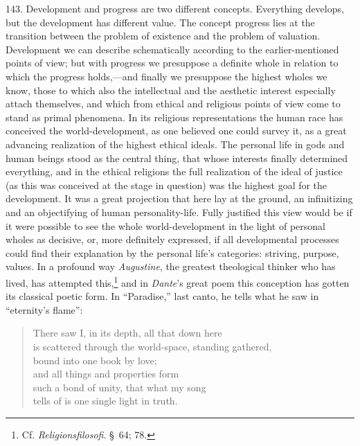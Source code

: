 \documentclass[12pt,a4paper]{book}
\begin{document}
143. Development and progress are two different concepts. Everything develops, but the development has
different value. The concept progress lies at the transition between the problem of existence and the
problem of valuation. Development we can describe schematically according to the earlier-mentioned points
of view; but with progress we presuppose a definite whole in relation to which the progress holds,---and
finally we presuppose the highest wholes we know, those to which also the intellectual and the aesthetic
interest especially attach themselves, and which from ethical and religious points of view come to stand
as primal phenomena. In its religious representations the human race has conceived the world-development,
as one believed one could survey it, as a great advancing realization of the highest ethical ideals. The
personal life in gods and human beings stood as the central thing, that whose interests finally determined
everything, and in the ethical religions the full realization of the ideal of justice (as this was
conceived at the stage in question) was the highest goal for the development. It was a great projection
that here lay at the ground, an infinitizing and an objectifying of human personality-life. Fully
justified this view would be if it were possible to see the whole world-development in the light of
personal wholes as decisive, or, more definitely expressed, if all developmental processes could find
their explanation by the personal life's categories: striving, purpose, values. In a profound way
\emph{Augustine}, the greatest theological thinker who has lived, has attempted this,\footnote{Cf.
\emph{Religionsfilosofi}. \S\ 64; 78.} and in \emph{Dante}'s great poem this conception has gotten its
classical poetic form. In ``Paradise,'' last canto, he tells what he saw in ``eternity's flame'':

\begin{quote}
There saw I, in its depth, all that down here\\
is scattered through the world-space, standing gathered,\\
bound into one book by love;\\
and all things and properties form\\
such a bond of unity, that what my song\\
tells of is one single light in truth.
\end{quote}
\end{document}
